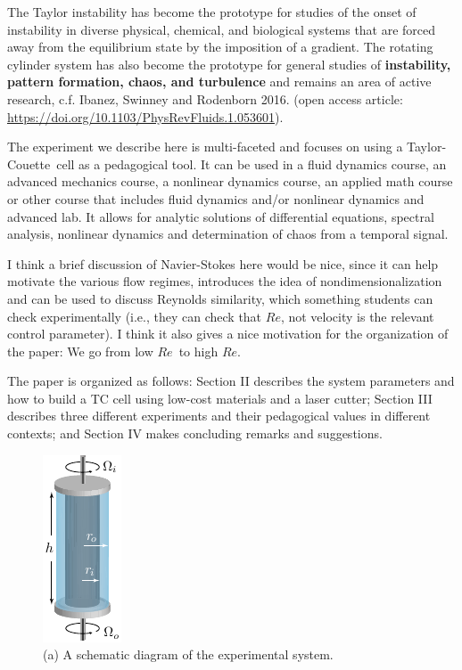\documentclass[%
reprint,
 amsmath,amssymb,
 aps,
prb,
floatfix,
longbibliography,
notitlepage
]{revtex4-1}
\newcommand{\DB}[1]{{\color{red}#1}} %
\newcommand{\TC}{Taylor-Couette}
\newcommand{\ReN}{\ensuremath{Re}} %
\begin{document}
The Taylor instability has become the prototype for studies of the onset of instability in diverse physical, chemical, and biological systems that are forced away from the equilibrium state by the imposition of a gradient.  The rotating cylinder system has also become the prototype for general studies of {\bf instability, pattern formation, chaos, and turbulence} and remains an area of active research, c.f. Ibanez, Swinney and Rodenborn 2016. (open access article: \url{https://doi.org/10.1103/PhysRevFluids.1.053601}).  

The experiment we describe here is multi-faceted and focuses on using a \TC\ cell as a pedagogical tool. It can be used in a fluid dynamics course, an advanced mechanics course, a nonlinear dynamics course, an applied math course or other course that includes fluid dynamics and/or nonlinear dynamics \DB{and advanced lab}.  It allows for analytic solutions of differential equations, spectral analysis, nonlinear dynamics and determination of chaos from a temporal signal. 

\DB{I think a brief discussion of Navier-Stokes here would be nice, since it can help motivate the various flow regimes, introduces the idea of nondimensionalization and can be used to discuss Reynolds similarity, which something students can check experimentally (i.e., they can check that \ReN, not velocity is the relevant control parameter). I think it also gives a nice motivation for the organization of the paper: We go from low \ReN\ to high \ReN.}

The paper is organized as follows: Section II describes the system parameters and how to build a TC cell using low-cost materials and a laser cutter; Section III describes three different experiments and their pedagogical values in different contexts; and Section IV makes concluding remarks and suggestions.


\begin{figure}[ht]
  \centering
    \includegraphics[width=.15\columnwidth]{1_Apparatus.pdf}
    \caption{\label{fig:schematic}(a) A schematic diagram of the experimental system.}
\end{figure}
\end{document}

